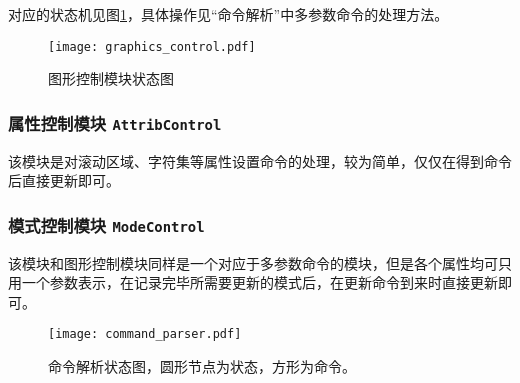 	对应的状态机见图\ref{fig:graphics_control}，具体操作见``命令解析''中多参数命令的处理方法。
\begin{figure}[htbp]
\centerline{
\texttt{[image: graphics\_control.pdf]}
}
\caption{图形控制模块状态图}
\label{fig:graphics_control}
\end{figure}
\subsubsection{属性控制模块 \texttt{AttribControl}}
该模块是对滚动区域、字符集等属性设置命令的处理，较为简单，仅仅在得到命令后直接更新即可。
\subsubsection{模式控制模块 \texttt{ModeControl}}
该模块和图形控制模块同样是一个对应于多参数命令的模块，但是各个属性均可只用一个参数表示，在记录完毕所需要更新的模式后，在更新命令到来时直接更新即可。

\begin{landscape}
	\begin{figure}[htbp]
	\centerline{
	\texttt{[image: command\_parser.pdf]}
	}
	\caption{命令解析状态图，圆形节点为状态，方形为命令。}
	\label{fig:command_parser}
	\end{figure}
\end{landscape}
